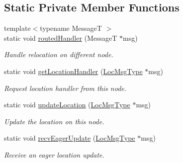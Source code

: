 \subsection*{Static Private Member Functions}
\begin{DoxyCompactItemize}
\item 
{\footnotesize template$<$typename MessageT $>$ }\\static void \hyperlink{structvt_1_1location_1_1_entity_location_coord_a1a6da8e3885d431284325e2959c48f8e}{routed\+Handler} (MessageT $\ast$msg)
\begin{DoxyCompactList}\small\item\em Handle relocation on different node. \end{DoxyCompactList}\item 
static void \hyperlink{structvt_1_1location_1_1_entity_location_coord_a42978b37cb0a0847f929f49e6286e5bc}{get\+Location\+Handler} (\hyperlink{structvt_1_1location_1_1_entity_location_coord_a8799cbd5fb0fb04cfdd1012fe1d5908f}{Loc\+Msg\+Type} $\ast$msg)
\begin{DoxyCompactList}\small\item\em Request location handler from this node. \end{DoxyCompactList}\item 
static void \hyperlink{structvt_1_1location_1_1_entity_location_coord_a6102920cd3ab80156a77e5f15d92ffcf}{update\+Location} (\hyperlink{structvt_1_1location_1_1_entity_location_coord_a8799cbd5fb0fb04cfdd1012fe1d5908f}{Loc\+Msg\+Type} $\ast$msg)
\begin{DoxyCompactList}\small\item\em Update the location on this node. \end{DoxyCompactList}\item 
static void \hyperlink{structvt_1_1location_1_1_entity_location_coord_a98ffa928c0a52ed5d6852200db31ade6}{recv\+Eager\+Update} (\hyperlink{structvt_1_1location_1_1_entity_location_coord_a8799cbd5fb0fb04cfdd1012fe1d5908f}{Loc\+Msg\+Type} $\ast$msg)
\begin{DoxyCompactList}\small\item\em Receive an eager location update. \end{DoxyCompactList}\end{DoxyCompactItemize}
